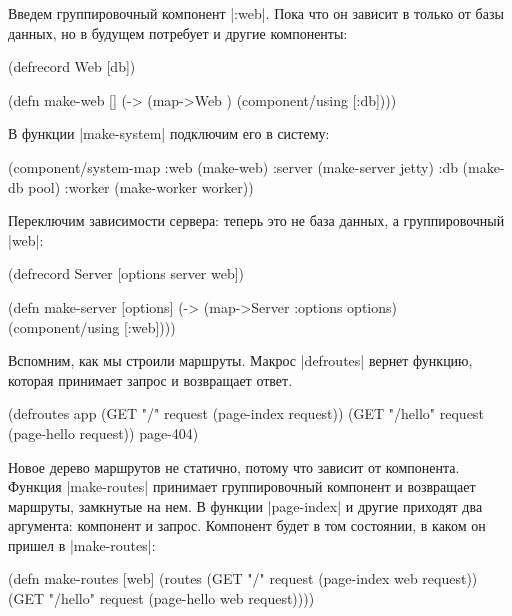 Введем группировочный компонент \spverb|:web|. Пока что он зависит в только от
базы данных, но в будущем потребует и другие компоненты:

\begin{english}
  \begin{clojure}
(defrecord Web [db])

(defn make-web []
  (-> (map->Web {})
      (component/using [:db])))
  \end{clojure}
\end{english}

В функции \spverb|make-system| подключим его в систему:

\begin{english}
  \begin{clojure}
(component/system-map
 :web    (make-web)
 :server (make-server jetty)
 :db     (make-db pool)
 :worker (make-worker worker))
  \end{clojure}
\end{english}

Переключим зависимости сервера: теперь это не база данных, а группировочный
\spverb|web|:

\begin{english}
  \begin{clojure}
(defrecord Server
  [options server web])

(defn make-server
  [options]
  (-> (map->Server {:options options})
      (component/using [:web])))
  \end{clojure}
\end{english}

Вспомним, как мы строили маршруты. Макрос \spverb|defroutes| вернет функцию,
которая принимает запрос и возвращает ответ.

\begin{english}
  \begin{clojure}
(defroutes app
  (GET "/"      request (page-index request))
  (GET "/hello" request (page-hello request))
  page-404)
  \end{clojure}
\end{english}

Новое дерево маршрутов не статично, потому что зависит от компонента. Функция
\spverb|make-routes| принимает группировочный компонент и возвращает маршруты,
замкнутые на нем. В функции \spverb|page-index| и другие приходят два аргумента:
компонент и запрос. Компонент будет в том состоянии, в каком он пришел в
\spverb|make-routes|:

\begin{english}
  \begin{clojure}
(defn make-routes [web]
  (routes
   (GET "/"      request (page-index web request))
   (GET "/hello" request (page-hello web request))))
  \end{clojure}
\end{english}

